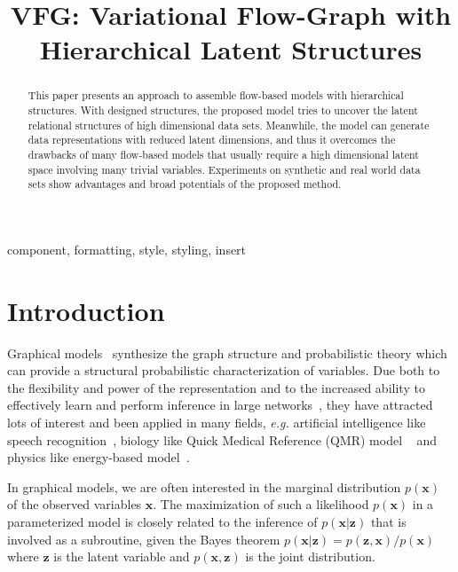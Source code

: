 \documentclass[conference]{IEEEtran}
\begin{document}
\title{VFG: Variational Flow-Graph with Hierarchical Latent Structures\\
}

\author{}

\maketitle


\begin{abstract}
This paper presents an approach to  assemble flow-based models with hierarchical structures.  With  designed  structures, the proposed model tries to uncover the latent relational structures of  high dimensional data sets.  Meanwhile, the model can generate  data representations with reduced latent dimensions, and thus it overcomes the drawbacks of many flow-based models that usually require a high dimensional latent space involving many trivial variables.  Experiments on synthetic and real world data sets show advantages and broad potentials of the proposed method. 
\end{abstract}

\begin{IEEEkeywords}
component, formatting, style, styling, insert
\end{IEEEkeywords}
\section{Introduction}
Graphical models~\cite{madigan1995bayesian,hruschka2007bayesian} synthesize the graph structure and probabilistic theory which can provide a structural probabilistic characterization of variables. Due both to the flexibility and
power of the representation and to the increased ability to effectively learn and
perform inference in large networks~\cite{koller2007graphical}, they have attracted lots of interest and been applied in many fields, \textit{e.g.} artificial intelligence like speech recognition~\cite{bilmes2005graphical}, biology like Quick Medical Reference (QMR) model ~\cite{shwe1990probabilistic} and physics like energy-based model~\cite{jordan2004graphical}.

In graphical models, we are often interested in the marginal distribution $p(\mathbf{x})$ of the observed variables $\mathbf{x}$. The maximization of such a likelihood $p(\mathbf{x})$ in a parameterized model is closely related to the inference of $p(\mathbf{x}|\mathbf{z})$ that is involved as a subroutine, given the Bayes theorem $p(\mathbf{x}|\mathbf{z}) = p(\mathbf{z}, \mathbf{x}) / p(\mathbf{x})$ where $\mathbf{z}$ is the latent variable and $p(\mathbf{x}, \mathbf{z})$ is the joint distribution. 
\end{document}
